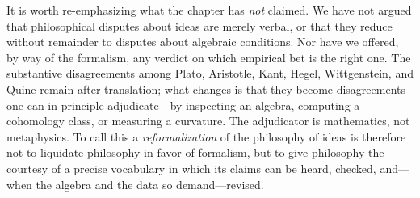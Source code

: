It is worth re-emphasizing what the chapter has \emph{not} claimed.
We have not argued that philosophical disputes about ideas are merely
verbal, or that they reduce without remainder to disputes about
algebraic conditions. Nor have we offered, by way of the formalism,
any verdict on which empirical bet is the right one. The substantive
disagreements among Plato, Aristotle, Kant, Hegel, Wittgenstein, and
Quine remain after translation; what changes is that they become
disagreements one can in principle adjudicate---by inspecting an
algebra, computing a cohomology class, or measuring a curvature. The
adjudicator is mathematics, not metaphysics. To call this a
\emph{reformalization} of the philosophy of ideas is therefore not to
liquidate philosophy in favor of formalism, but to give philosophy the
courtesy of a precise vocabulary in which its claims can be heard,
checked, and---when the algebra and the data so demand---revised.
